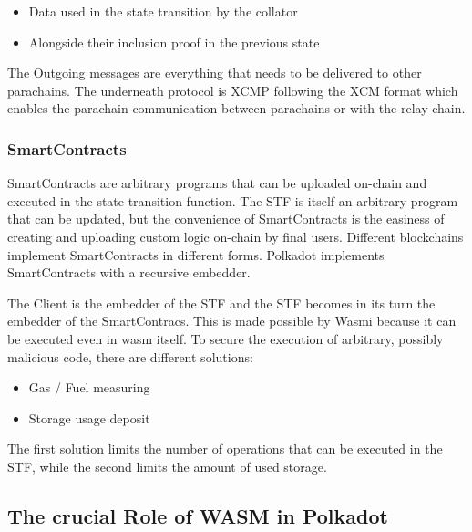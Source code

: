 \documentclass[../main.tex]{subfiles}
\begin{document}

\begin{itemize}
  \item Data used in the state transition by the collator
  \item Alongside their inclusion proof in the previous state
\end{itemize}


The Outgoing messages are everything that needs to be delivered to other parachains. The underneath protocol is XCMP following the XCM format which enables the parachain communication between parachains or with the relay chain.

\subsubsection{SmartContracts}

SmartContracts are arbitrary programs that can be uploaded on-chain and executed in the state transition function. The STF is itself an arbitrary program that can be updated, but the convenience of SmartContracts is the easiness of creating and uploading custom logic on-chain by final users. Different blockchains implement SmartContracts in different forms.  Polkadot implements SmartContracts with a recursive embedder.

The Client is the embedder of the STF and the STF becomes in its turn the embedder of the SmartContracs.  This is made possible by Wasmi because it can be executed even in wasm itself. To secure the execution of arbitrary, possibly malicious code,  there are different solutions:

\begin{itemize}
  \item Gas / Fuel measuring
  \item Storage usage deposit
\end{itemize}

The first solution limits the number of operations that can be executed in the STF, while   the second  limits the amount of used storage.

\subsection{The crucial Role of WASM in Polkadot}
\end{document}
